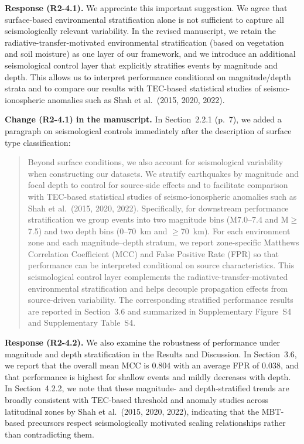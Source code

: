 \documentclass[12pt]{article}
\newcommand{\revresponse}[1]{\begingroup\color{responsecolor}#1\endgroup}
\newcommand{\revchange}[1]{\begingroup\color{changecolor}#1\endgroup}
\begin{document}
\revresponse{%
\textbf{Response (R2-4.1).} We appreciate this important suggestion. We agree that surface-based environmental stratification alone is not sufficient to capture all seismologically relevant variability. In the revised manuscript, we retain the radiative-transfer-motivated environmental stratification (based on vegetation and soil moisture) as one layer of our framework, and we introduce an additional seismological control layer that explicitly stratifies events by magnitude and depth. This allows us to interpret performance conditional on magnitude/depth strata and to compare our results with TEC-based statistical studies of seismo-ionospheric anomalies such as Shah et al.~(2015, 2020, 2022).
}

\revchange{%
\textbf{Change (R2-4.1) in the manuscript.}
In Section~2.2.1 (p.~7), we added a paragraph on seismological controls immediately after the description of surface type classification:

\begin{quote}
Beyond surface conditions, we also account for seismological variability when constructing our datasets. We stratify earthquakes by magnitude and focal depth to control for source-side effects and to facilitate comparison with TEC-based statistical studies of seismo-ionospheric anomalies such as Shah et al.~(2015, 2020, 2022). Specifically, for downstream performance stratification we group events into two magnitude bins (M7.0--7.4 and M$\ge$7.5) and two depth bins (0--70~km and $\ge$70~km). For each environment zone and each magnitude--depth stratum, we report zone-specific Matthews Correlation Coefficient (MCC) and False Positive Rate (FPR) so that performance can be interpreted conditional on source characteristics. This seismological control layer complements the radiative-transfer-motivated environmental stratification and helps decouple propagation effects from source-driven variability. The corresponding stratified performance results are reported in Section~3.6 and summarized in Supplementary Figure~S4 and Supplementary Table~S4.
\end{quote}

}

\revresponse{%
\textbf{Response (R2-4.2).} We also examine the robustness of performance under magnitude and depth stratification in the Results and Discussion. In Section~3.6, we report that the overall mean MCC is 0.804 with an average FPR of 0.038, and that performance is highest for shallow events and mildly decreases with depth. In Section~4.2.2, we note that these magnitude- and depth-stratified trends are broadly consistent with TEC-based threshold and anomaly studies across latitudinal zones by Shah et al.~(2015, 2020, 2022), indicating that the MBT-based precursors respect seismologically motivated scaling relationships rather than contradicting them.
}
\end{document}
